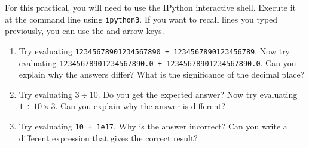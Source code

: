\documentclass[a4paper,twoside,titlepage]{memoir}
\makeatletter
\newcommand{\FrameTitle}[2]{%
  \fboxrule=\FrameRule \fboxsep=\FrameSep
  \fbox{\vbox{\nobreak \vskip -0.7\FrameSep
    \rlap{\centerline{\strut#1}}\nobreak\nointerlineskip%
    \vskip 0.7\FrameSep
    \hbox{#2}}}}
\newenvironment{framewithtitle}[2][\FrameFirst@Lab\ (cont.)]{%
  \def\FrameFirst@Lab{\textbf{#2}}%
  \def\FrameCont@Lab{\textbf{#1}}%
  \def\FrameCommand##1{%
    \FrameTitle{\FrameFirst@Lab}{##1}}%
  \def\FirstFrameCommand##1{%
    \FrameTitle{\FrameFirst@Lab}{##1}}%
  \def\MidFrameCommand##1{%
    \FrameTitle{\FrameCont@Lab}{##1}}%
  \def\LastFrameCommand##1{%
    \FrameTitle{\FrameCont@Lab}{##1}}%
\MakeFramed{\advance\hsize-\width \FrameRestore}}%
{\endMakeFramed}
\newcounter{exercisectr}
\newenvironment{exercise}
{\stepcounter{exercisectr}\begin{framewithtitle}{Practical \arabic{exercisectr}}}
{\end{framewithtitle}}
\newcommand{\shellcmd}{\texttt}
\makeatother
\begin{document}
\begin{exercise}
For this practical, you will need to use the IPython interactive shell.  Execute it at the command line using \shellcmd{ipython3}.  If you want to recall lines you typed previously, you can use the \keys{\arrowkeyup} and \keys{\arrowkeydown} arrow keys.
\begin{enumerate}
\item Try evaluating \shellcmd{12345678901234567890 + 1234567890123456789}.  Now try evaluating \shellcmd{12345678901234567890.0 + 12345678901234567890.0}.  Can you explain why the answers differ?  What is the significance of the decimal place?

\item Try evaluating $3 \div 10$.  Do you get the expected answer?  Now try evaluating $1 \div 10 \times 3$.  Can you explain why the answer is different?

\item Try evaluating \shellcmd{10 + 1e17}.  Why is the answer incorrect?  Can you write a different expression that gives the correct result? %
\end{enumerate}
\end{exercise}
\end{document}
